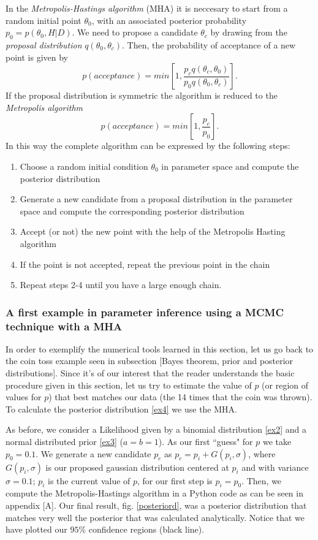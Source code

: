 \documentclass[onecolumn,           %
               showpacs,            %
               preprintnumbers,     %
               aps,                 %
               letterpaper,             %
               superscriptaddress,      %
               nofootinbib,         %
               tightenlines,        %
               floats,floatfix      %
               ,usenatbib,
               ]{revtex4-1}
\begin{document}
In the \textit{Metropolis-Hastings algorithm} (MHA) \cite{metr} it is neccesary to start from a random initial point $\theta_0$, with an associated posterior probability $p_0=p(\theta_0,H|D)$. We need to propose a candidate $\theta_c$ by drawing from the \textit{proposal distribution} $q(\theta_0,\theta_c)$. Then, the probability of acceptance of a new point is given by
\begin{equation}
p(acceptance)=min\left[1,\frac{p_cq(\theta_c,\theta_0)}{p_0q(\theta_0,\theta_c)}\right].
\end{equation}
If the proposal distribution is symmetric the algorithm is reduced to the \textit{Metropolis algorithm}
  \begin{equation}
  p(acceptance)=min\left[1,\frac{p_c}{p_0}\right].
  \end{equation}
In this way the complete algorithm can be expressed by the following steps:
\begin{enumerate}
\item Choose a random initial condition $\theta_0$ in parameter space and compute the posterior distribution
\item Generate a new candidate from a proposal distribution in the parameter space and compute the corresponding posterior distribution
\item Accept (or not) the new point with the help of the Metropolis Hasting algorithm
\item If the point is not accepted, repeat the previous point in the chain
\item Repeat steps 2-4 until you have a large enough chain.
\end{enumerate}

\subsubsection{A first example in parameter inference using a MCMC technique with a MHA}

In order to exemplify the numerical tools learned in this section, let us 
go back to the coin toss example seen in subsection [Bayes theorem, prior and posterior distributions]. Since it's of our interest that the reader understands the basic procedure given in this section, let us try to estimate the value of $p$ (or region of values for $p$) that best matches our data (the 14 times that the coin was thrown). To calculate the posterior distribution \eqref{ex4} we use the MHA. 

As before, we consider a Likelihood given by a binomial distribution \eqref{ex2} and a normal distributed prior \eqref{ex3} ($a=b=1$). As our first ``guess" for $p$ we take $p_0=0.1$. We generate a new candidate $p_c$ as $p_c=p_i+G(p_i,\sigma)$, where $G(p_i,\sigma)$ is our proposed gaussian distribution centered at $p_i$ and with variance $\sigma=0.1$; $p_i$ is the current value of $p$, for our first step is $p_i=p_0$. Then, we compute the Metropolis-Hastings algorithm in a Python code as can be seen in appendix [A]. Our final result,  fig. \ref{posteriord}, was a posterior distribution that matches very well the posterior that was calculated analytically. Notice that we have plotted our $95\%$ confidence regions (black line). 
\end{document}
